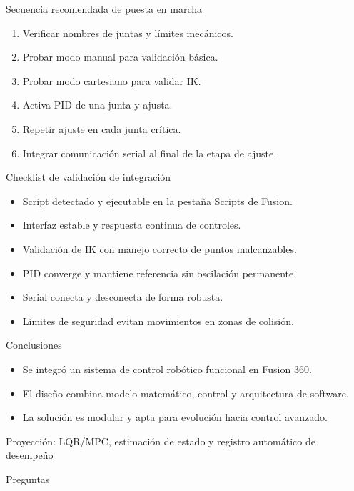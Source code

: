 \documentclass[aspectratio=169]{beamer}
\begin{document}
\begin{frame}{Secuencia recomendada de puesta en marcha}
\begin{enumerate}
  \item Verificar nombres de juntas y límites mecánicos.
  \item Probar modo manual para validación básica.
  \item Probar modo cartesiano para validar IK.
  \item Activa PID de una junta y ajusta.
  \item Repetir ajuste en cada junta crítica.
  \item Integrar comunicación serial al final de la etapa de ajuste.
\end{enumerate}
\end{frame}

\begin{frame}{Checklist de validación de integración}
\begin{itemize}
  \item Script detectado y ejecutable en la pestaña Scripts de Fusion.
  \item Interfaz estable y respuesta continua de controles.
  \item Validación de IK con manejo correcto de puntos inalcanzables.
  \item PID converge y mantiene referencia sin oscilación permanente.
  \item Serial conecta y desconecta de forma robusta.
  \item Límites de seguridad evitan movimientos en zonas de colisión.
\end{itemize}
\end{frame}

\begin{frame}{Conclusiones}
\begin{itemize}
  \item Se integró un sistema de control robótico funcional en Fusion 360.
  \item El diseño combina modelo matemático, control y arquitectura de software.
  \item La solución es modular y apta para evolución hacia control avanzado.
\end{itemize}
\vspace{0.5em}
\centering
\Large{Proyección: LQR/MPC, estimación de estado y registro automático de desempeño}
\end{frame}

\begin{frame}
\centering
\Huge Preguntas
\end{frame}
\end{document}
